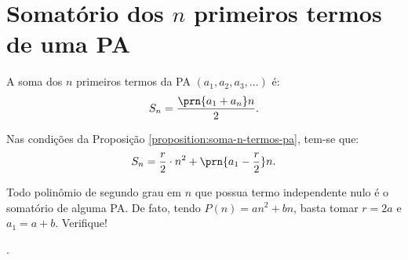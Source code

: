 \section{Somatório dos $n$ primeiros termos de uma PA}

\begin{proposition}
\label{proposition:soma-n-termos-pa}
A soma dos $n$ primeiros termos da PA $(a_1, a_2, a_3, \dots)$ é:
%
\begin{equation*}
S_n = \frac {\prn {a_1+a_n}n} 2.
\end{equation*}
\end{proposition}

\begin{corollary}
Nas condições da Proposição \ref{proposition:soma-n-termos-pa}, tem-se que:
%
\begin{equation*}
S_n = \frac r 2 \cdot n^2 + \prn{a_1 - \frac r 2}n.
\end{equation*}
\end{corollary}

\begin{remark}
Todo polinômio de segundo grau em $n$ que possua termo independente nulo é o somatório de alguma PA. De fato, tendo $P(n) = an^2 + bn$, basta tomar $r = 2a$ e $a_1 = a+b$. Verifique!
\end{remark}

\begin{tve}
	.
\end{tve}
